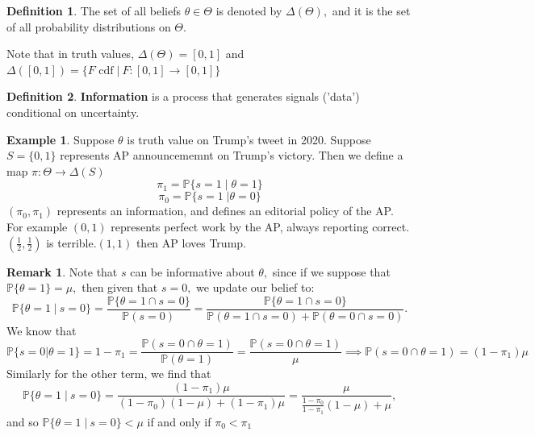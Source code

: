 \documentclass[10pt, oneside]{article}
\newcommand{\bbP}{\mathbb{P}}
\theoremstyle{definition}
\newtheorem{exmp}{Example}[section]
\newtheorem{defn}{Definition}
\newtheorem{rem}{Remark}
\begin{document}
\begin{defn}
    The set of all beliefs $\theta \in \Theta$ is denoted by $\Delta(\Theta),$ and it is the set of all probability distributions on $\Theta.$
\end{defn}
Note that in truth values, $\Delta(\Theta) = [0,1]$ and $\Delta([0,1]) = \{F \text{ cdf} \; | \: F: [0,1] \to [0,1]\}$

\begin{defn}
    \textbf{Information} is a process that generates signals ('data') conditional on uncertainty.
\end{defn}
\begin{exmp}
    Suppose $\theta$ is truth value on Trump's tweet in 2020. Suppose $S = \{0,1\}$ represents AP announcememnt on Trump's victory. Then we define a map $\pi: \Theta \to \Delta(S)$
    \[\pi_1 = \bbP\{s = 1 \; | \; \theta = 1\}\]
    \[\pi_0 = \bbP\{s = 1 \;  | \theta = 0\}\] $(\pi_0, \pi_1)$ represents an information, and defines an editorial policy of the AP. For example $(0,1)$ represents perfect work by the AP, always reporting correct. $(\frac{1}{2}, \frac{1}{2})$ is terrible.$(1,1)$ then AP loves Trump.
\end{exmp}
\begin{rem}
    Note that $s$ can be informative about $\theta,$ since if we suppose that $\bbP\{\theta = 1\} = \mu,$ then given that $s = 0,$ we update our belief to:
    \[\bbP\{\theta = 1 \; | \: s = 0\} = \frac{\bbP\{\theta = 1 \cap s = 0\}}{\bbP(s = 0)}= \frac{\bbP\{\theta = 1 \cap s = 0\}}{\bbP(\theta = 1 \cap s = 0) + \bbP(\theta = 0 \cap s=0)}.\] We know that 
    \[\bbP\{s = 0 | \theta = 1\} = 1-\pi_1 = \frac{\bbP(s = 0 \cap \theta = 1)}{\bbP(\theta = 1)} = \frac{\bbP(s = 0 \cap \theta = 1)}{\mu} \implies \bbP(s = 0 \cap \theta = 1) = (1-\pi_1)\mu\] Similarly for the other term, we find that 
    \[\bbP\{\theta = 1 \; | \: s = 0\} = \frac{(1-\pi_1)\mu}{(1-\pi_0)(1-\mu) + (1-\pi_1)\mu} = \frac{\mu}{\frac{1-\pi_0}{1-\pi_1}(1-\mu) + \mu},\] and so $\bbP\{\theta = 1 \; | \: s = 0\} < \mu$ if and only if $\pi_0 < \pi_1$
\end{rem}

\newpage
\end{document}
